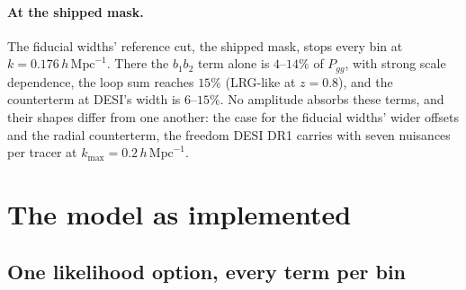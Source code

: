 \documentclass[11pt]{article}
\newcommand{\bone}{b_1}            %
\newcommand{\btwo}{b_2}            %
\newcommand{\kmax}{k_{\mathrm{max}}}
\newcommand{\hMpc}{\,h\,\mathrm{Mpc}^{-1}}
\begin{document}
\paragraph{At the shipped mask.}
The fiducial widths' reference cut, the shipped mask, stops every bin at
$k = 0.176\hMpc$.  There the $\bone\btwo$ term alone is $4$--$14\%$ of
$P_{gg}$, with strong scale dependence, the loop sum reaches $15\%$
(LRG-like at $z = 0.8$), and the counterterm at DESI's width is
$6$--$15\%$.  No amplitude absorbs these terms, and their shapes
differ from one another: the case for the fiducial widths' wider
offsets and the
radial counterterm, the freedom DESI DR1 carries with seven nuisances
per tracer at $\kmax = 0.2\hMpc$.

\section{The model as implemented}
\label{sec:model}

\subsection{One likelihood option, every term per bin}
\label{sec:option}
\end{document}
